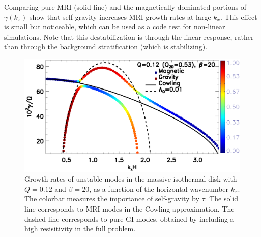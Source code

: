 Comparing pure MRI (solid line) and the magnetically-dominated
portions of $\gamma(k_x)$ show that self-gravity increases MRI growth
rates at large $k_x$. This effect is small but noticeable, which can
be used as a code test for non-linear simulations. Note that this
destabilization is through the linear response, rather 
than through the background stratification (which is stabilizing).  


\begin{figure}
  \includegraphics[width=\linewidth]{figures/compare_growth3_Q0d12_B20.ps}  
  \caption{Growth rates of unstable modes in the massive isothermal
    disk with $Q=0.12$ and $\beta=20$, as a function of the horizontal
    wavenumber $k_x$. The colorbar measures the importance of
    self-gravity by $\tau$. The solid line corresponds to MRI modes in the
    Cowling approximation. The dashed line corresponds to pure GI
    modes, obtained by including a high resisitivity in the full
    problem. 
    \label{compare_growth3_Q01d2}}
\end{figure}

